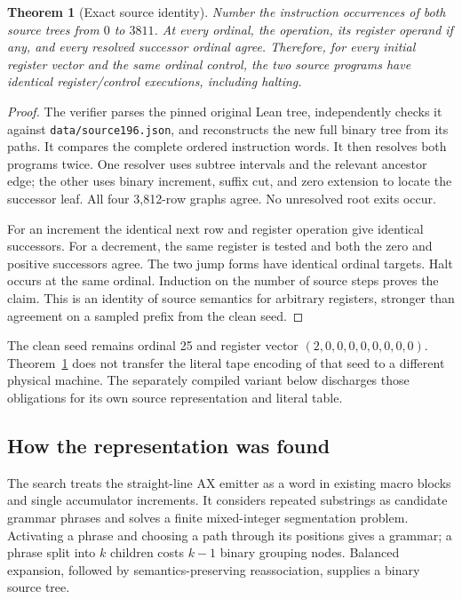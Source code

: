 \documentclass[11pt,letterpaper]{article}
\newtheorem{theorem}{Theorem}[section]
\newcommand{\file}[1]{\texttt{\nolinkurl{#1}}}
\begin{document}
\begin{theorem}[Exact source identity]\label{thm:source}
Number the instruction occurrences of both source trees from $0$ to
$3811$. At every ordinal, the operation, its register operand if any,
and every resolved successor ordinal agree. Therefore, for every initial
register vector and the same ordinal control, the two source programs
have identical register/control executions, including halting.
\end{theorem}
\begin{proof}
The verifier parses the pinned original Lean tree, independently checks it
against \file{data/source196.json}, and reconstructs the new full binary
tree from its paths. It compares the complete ordered instruction words.
It then resolves both programs twice. One resolver uses subtree intervals
and the relevant ancestor edge; the other uses binary increment, suffix
cut, and zero extension to locate the successor leaf. All four 3,812-row
graphs agree. No unresolved root exits occur.

For an increment the identical next row and register operation give
identical successors. For a decrement, the same register is tested and
both the zero and positive successors agree. The two jump forms have
identical ordinal targets. Halt occurs at the same ordinal. Induction on
the number of source steps proves the claim. This is an identity of source
semantics for arbitrary registers, stronger than agreement on a sampled
prefix from the clean seed.
\end{proof}

The clean seed remains ordinal 25 and register vector
$(2,0,0,0,0,0,0,0,0)$. Theorem~\ref{thm:source} does not transfer the
literal tape encoding of that seed to a different physical machine.
The separately compiled variant below discharges those obligations for
its own source representation and literal table.

\subsection{How the representation was found}

The search treats the straight-line AX emitter as a word in existing
macro blocks and single accumulator increments. It considers repeated
substrings as candidate grammar phrases and solves a finite mixed-integer
segmentation problem. Activating a phrase and choosing a path through its
positions gives a grammar; a phrase split into $k$ children costs $k-1$
binary grouping nodes. Balanced expansion, followed by semantics-preserving
reassociation, supplies a binary source tree.
\end{document}
